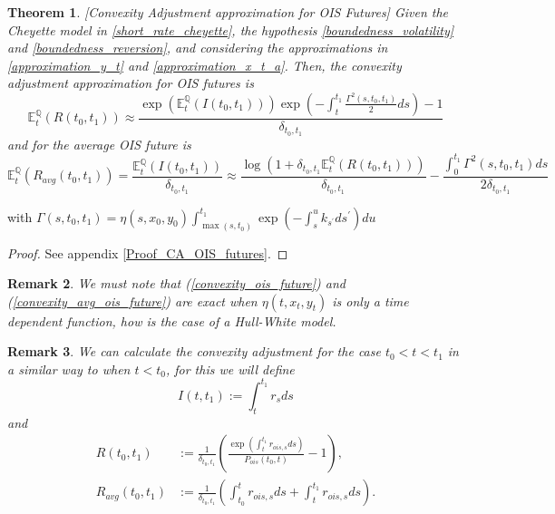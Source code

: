 \documentclass[a4paper,10pt]{article}
\newtheorem{theorem}{Theorem}[section]
\newtheorem{remark}[theorem]{Remark}
\newcommand{\1}{\mathbf{1}}
\begin{document}
\begin{theorem}\label{Th_CA_OIS}[Convexity Adjustment approximation for OIS Futures]
Given the Cheyette model in \eqref{short_rate_cheyette}, the hypothesis \ref{boundedness_volatility} and \ref{boundedness_reversion}, and considering the approximations in \eqref{approximation_y_t} and \eqref{approximation_x_t_a}. Then, the convexity adjustment approximation for OIS futures is 
\begin{equation}\label{convexity_ois_future}
\mathbb{E}_t^{\mathbb{Q}}\left(R(t_0,t_1)\right) \approx \frac{\exp\left(\mathbb{E}_t^{\mathbb{Q}}\left(I(t_0,t_1)\right)\right)\exp\left(-\int_{t}^{t_1}\frac{\Gamma^{2}(s,t_0,t_1)}{2} ds\right) - 1}{\delta_{t_0,t_1}}
\end{equation}
and for the average OIS future is
\begin{equation}\label{convexity_avg_ois_future}
\mathbb{E}_t^{\mathbb{Q}}\left(R_{avg}(t_0,t_1)\right) = \frac{\mathbb{E}_t^{\mathbb{Q}}\left(I(t_0,t_1)\right) }{\delta_{t_0,t_1}} \approx \frac{\log\left(1+\delta_{t_0,t_1}  \mathbb{E}_t^{\mathbb{Q}}\left(R(t_0,t_1)\right) \right)}{\delta_{t_0,t_1}} - \frac{\int_{0}^{t_1}  \Gamma^{2}(s,t_0,t_1) ds}{2\delta_{t_0,t_1}}
\end{equation}
\end{theorem}
with  $\Gamma(s,t_0,t_1)= \eta(s,x_0,y_0)\int_{\max(s, t_{0})}^{t_1} \exp\left( -\int_{s}^{u} k_{s^{\prime}} ds^{\prime}\right)du$
\begin{proof}
See appendix \ref{Proof_CA_OIS_futures}.
\end{proof}

\begin{remark}
We must note that (\ref{convexity_ois_future}) and (\ref{convexity_avg_ois_future}) are exact when $\eta(t,x_t, y_t)$ is only a time dependent function, how is the case of a Hull-White model.
\end{remark}

\begin{remark}
We can calculate the convexity adjustment for the case $t_0 < t < t_1$ in a similar way to when $t < t_0$, for this we will define
\begin{equation*}
I(t,t_1):=\int_{t}^{t_1} r_s ds
\end{equation*}
and 
\begin{align*}
R(t_0,t_1) &:= \frac{1}{\delta_{t_0,t_1}}\left(\frac{\exp(\int_{t}^{t_1} r_{ois,s} ds )}{P_{ois}(t_0,t)} - 1\right), \\
R_{avg}(t_0,t_1) &:= \frac{1}{\delta_{t_0,t_1}}\left(\int_{t_0}^{t} r_{ois,s} ds + \int_{t}^{t_1} r_{ois,s} ds\right).   
\end{align*}
\end{remark}
\end{document}
